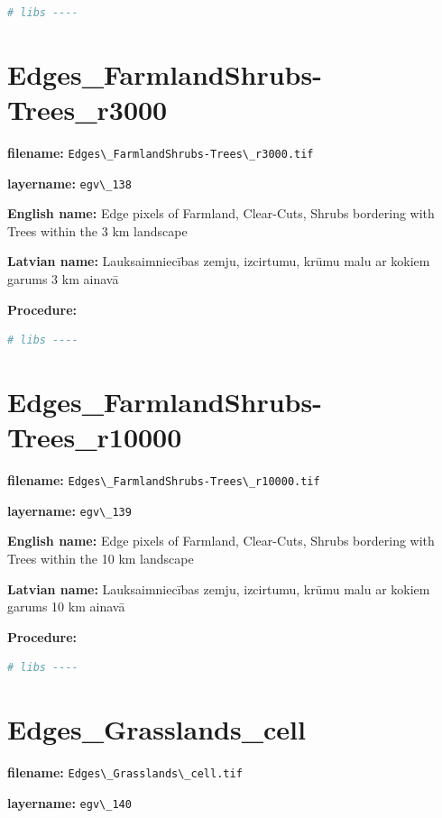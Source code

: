 \documentclass[
]{book}
\newcommand{\passthrough}[1]{#1}
\begin{document}
\begin{lstlisting}[language=R]
# libs ----
\end{lstlisting}

\section{Edges\_FarmlandShrubs-Trees\_r3000}\label{ch06.138}

\textbf{filename:} \passthrough{\lstinline!Edges\_FarmlandShrubs-Trees\_r3000.tif!}

\textbf{layername:} \passthrough{\lstinline!egv\_138!}

\textbf{English name:} Edge pixels of Farmland, Clear-Cuts, Shrubs bordering with Trees within the 3 km landscape

\textbf{Latvian name:} Lauksaimniecības zemju, izcirtumu, krūmu malu ar kokiem garums 3 km ainavā

\textbf{Procedure:}

\begin{lstlisting}[language=R]
# libs ----
\end{lstlisting}

\section{Edges\_FarmlandShrubs-Trees\_r10000}\label{ch06.139}

\textbf{filename:} \passthrough{\lstinline!Edges\_FarmlandShrubs-Trees\_r10000.tif!}

\textbf{layername:} \passthrough{\lstinline!egv\_139!}

\textbf{English name:} Edge pixels of Farmland, Clear-Cuts, Shrubs bordering with Trees within the 10 km landscape

\textbf{Latvian name:} Lauksaimniecības zemju, izcirtumu, krūmu malu ar kokiem garums 10 km ainavā

\textbf{Procedure:}

\begin{lstlisting}[language=R]
# libs ----
\end{lstlisting}

\section{Edges\_Grasslands\_cell}\label{ch06.140}

\textbf{filename:} \passthrough{\lstinline!Edges\_Grasslands\_cell.tif!}

\textbf{layername:} \passthrough{\lstinline!egv\_140!}
\end{document}
